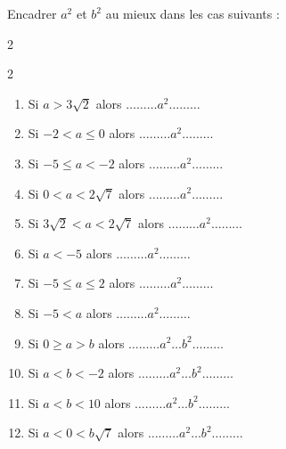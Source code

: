 \documentclass[main.tex]{subfiles}
\begin{document}
\begin{exercise}  Encadrer  $a^2$ et $b^2$ au mieux dans les cas suivants :  \hfill  
\vspace{-0.5em}
	\begin{multicols}{2}
\begin{spacing}{2} 
	\begin{enumerate}[label={}, leftmargin=*]   
		\item Si $a>3\sqrt{2}$ alors \hfill \hfill $\ldots\ldots \ldots a^2 \ldots  \ldots\ldots$
		\item Si $-2<a\leqslant 0$ alors \hfill \hfill $\ldots\ldots \ldots a^2 \ldots  \ldots\ldots$
		\item Si $-5\leqslant a < -2$ alors \hfill \hfill $\ldots\ldots \ldots a^2 \ldots  \ldots\ldots$
		\item Si $0< a < 2\sqrt{7}$ alors \hfill \hfill $\ldots\ldots \ldots a^2 \ldots  \ldots\ldots$
		\item Si $3\sqrt{2} <a <2\sqrt{7}$ alors \hfill \hfill $\ldots\ldots \ldots a^2 \ldots  \ldots\ldots$
		\item Si $a<-5$ alors \hfill \hfill $\ldots\ldots \ldots a^2 \ldots  \ldots\ldots$
		\item Si $-5\leqslant a \leqslant 2$ alors \hfill \hfill $\ldots\ldots \ldots a^2 \ldots  \ldots\ldots$
		\item Si $-5<a$ alors \hfill \hfill $\ldots\ldots \ldots a^2 \ldots  \ldots\ldots$
		\item  Si $0\geqslant a> b$ alors \hfill $\ldots\ldots \ldots a^2 \ldots b^2\ldots \ldots\ldots$
		\item  Si $a< b< -2$ alors \hfill $\ldots\ldots \ldots a^2 \ldots b^2\ldots \ldots\ldots$
		\item  Si $a< b< 10$ alors \hfill $\ldots\ldots \ldots a^2 \ldots b^2\ldots \ldots\ldots$
		\item  Si $a < 0<b\sqrt{7}$ alors \hfill $\ldots\ldots \ldots a^2 \ldots b^2\ldots \ldots\ldots$
	\end{enumerate}
\end{spacing}
\end{multicols}	
\vspace{-0.5em}  
\end{exercise}
\end{document}
